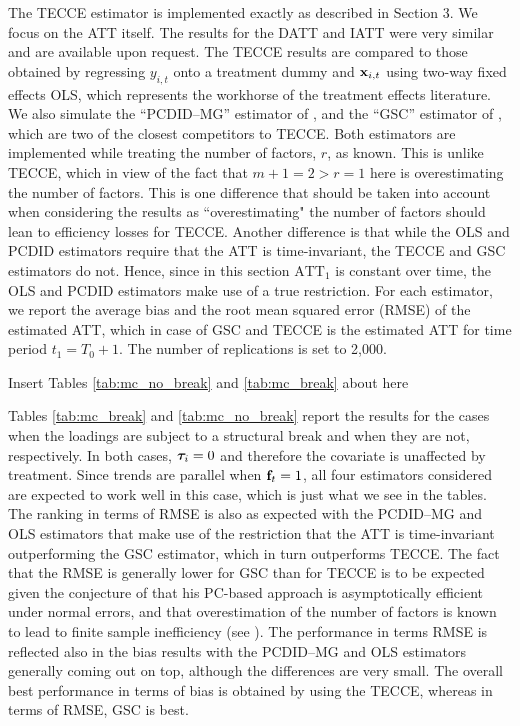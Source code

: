 \documentclass[12pt,fleqn]{article}
\begin{document}
  The TECCE estimator is implemented exactly as described in Section 3. We focus on the ATT itself. The results for the DATT and IATT were very similar and are available upon request. The TECCE results are compared to those obtained by regressing $y_{i,t}$ onto a treatment dummy and $\mathbf{x}_{i,t}$ using two-way fixed effects OLS, which represents the workhorse of the treatment effects literature. We also simulate the ``PCDID--MG'' estimator of \citet{chan2022pcdid}, and the ``GSC'' estimator of \citet{Xu_2017}, which are two of the closest competitors to TECCE. Both estimators are implemented while treating the number of factors, $r$, as known. This is unlike TECCE, which in view of the fact that $m+1 = 2 > r = 1$ here is overestimating the number of factors. This is one difference that should be taken into account when considering the results as ``overestimating" the number of factors should lean to efficiency losses for TECCE. Another difference is that while the OLS and PCDID estimators require that the ATT is time-invariant, the TECCE and GSC estimators do not. Hence, since in this section $\mathrm{ATT}_{1}$ is constant over time, the OLS and PCDID estimators make use of a true restriction. For each estimator, we report the average bias and the root mean squared error (RMSE) of the estimated ATT, which in case of GSC and TECCE is the estimated ATT for time period $t_1 = T_0+1$. The number of replications is set to 2,000.
  
  \begin{center}
  {\sc Insert Tables \ref{tab:mc_no_break} and \ref{tab:mc_break} about here}
  \end{center}
  
  Tables \ref{tab:mc_break} and \ref{tab:mc_no_break} report the results for the cases when the loadings are subject to a structural break and when they are not, respectively. In both cases, $\boldsymbol{\tau}_{i} = 0$ and therefore the covariate is unaffected by treatment. Since trends are parallel when $\mathbf{f}_{t} = 1$, all four estimators considered are expected to work well in this case, which is just what we see in the tables. The ranking in terms of RMSE is also as expected with the PCDID--MG and OLS estimators that make use of the restriction that the ATT is time-invariant outperforming the GSC estimator, which in turn outperforms TECCE. The fact that the RMSE is generally lower for GSC than for TECCE is to be expected given the conjecture of \citet{bai2009panel} that his PC-based approach is asymptotically efficient under normal errors, and that overestimation of the number of factors is known to lead to finite sample inefficiency (see \citealp{moon2015linear}). The performance in terms RMSE is reflected also in the bias results with the PCDID--MG and OLS estimators generally coming out on top, although the differences are very small. The overall best performance in terms of bias is obtained by using the TECCE, whereas in terms of RMSE, GSC is best.
  
\end{document}
